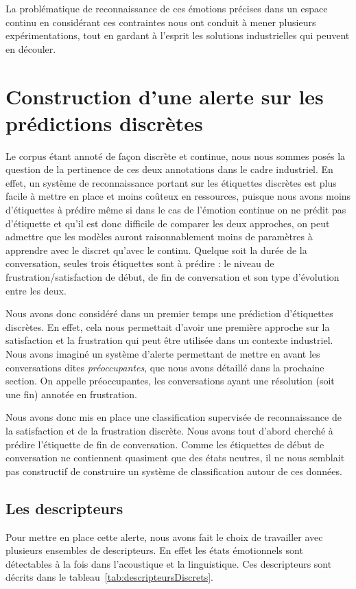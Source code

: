 La problématique de reconnaissance de ces émotions précises dans un espace continu en considérant ces contraintes nous ont conduit à mener plusieurs expérimentations, tout en gardant à l'esprit les solutions industrielles qui peuvent en découler.

\section{Construction d'une alerte sur les prédictions discrètes}
Le corpus étant annoté de façon discrète et continue, nous nous sommes posés la question de la pertinence de ces deux annotations dans le cadre industriel. En effet, un système de reconnaissance portant sur les étiquettes discrètes est plus facile à mettre en place et moins coûteux en ressources, puisque nous avons moins d'étiquettes à prédire même si dans le cas de l'émotion continue on ne prédit pas d'étiquette et qu'il est donc difficile de comparer les deux approches, on peut admettre que les modèles auront raisonnablement moins de paramètres à apprendre avec le discret qu'avec le continu. Quelque soit la durée de la conversation, seules trois étiquettes sont à prédire : le niveau de frustration/satisfaction de début, de fin de conversation et son type d'évolution entre les deux.

Nous avons donc considéré dans un premier temps une prédiction d'étiquettes discrètes. En effet, cela nous permettait d'avoir une première approche sur la satisfaction et la frustration qui peut être utilisée dans un contexte industriel. Nous avons imaginé un système d'alerte permettant de mettre en avant les conversations dites \emph{préoccupantes}, que nous avons détaillé dans la prochaine section. On appelle préoccupantes, les conversations ayant une résolution (soit une fin) annotée en frustration.

Nous avons donc mis en place une classification supervisée de reconnaissance de la satisfaction et de la frustration discrète. Nous avons tout d'abord cherché à prédire l'étiquette de fin de conversation. Comme les étiquettes de début de conversation ne contiennent quasiment que des états neutres, il ne nous semblait pas constructif de construire un système de classification autour de ces données.

\subsection{Les descripteurs}
Pour mettre en place cette alerte, nous avons fait le choix de travailler avec plusieurs ensembles de descripteurs. En effet les états émotionnels sont détectables à la fois dans l'acoustique et la linguistique. Ces descripteurs sont décrits dans le tableau~\ref{tab:descripteursDiscrets}.

